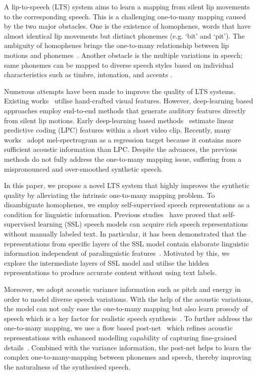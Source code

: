 \documentclass[letterpaper]{article} %
\begin{document}
A lip-to-speech (LTS) system aims to learn a mapping from silent lip movements to the corresponding speech.
This is a challenging one-to-many mapping caused by the two major obstacles.
One is the existence of homophenes, words that have almost identical lip movements but distinct phonemes (e.g. `bit' and `pit').
The ambiguity of homophenes brings the one-to-many relationship between lip motions and phonemes~\cite{son2017lip,kim2022distinguishing}.
Another obstacle is the multiple variations in speech; same phonemes can be mapped to diverse speech styles based on individual characteristics such as timbre, intonation, and accents \cite{elias2021parallel,kim2022fluenttts}.

Numerous attempts have been made to improve the quality of LTS systems.
Existing works~\cite{le2015reconstructing,le2017generating} utilise hand-crafted visual features. However, deep-learning based approaches employ end-to-end methods that generate auditory features directly from silent lip motions.
Early deep-learning based methods~\cite{ephrat2017vid2speech,kumar2019lipper} estimate linear predictive coding (LPC) features within a short video clip.
Recently, many works~\cite{prajwal2020learning, kim2021lip, yadav2021speech, he2022flow, mira2022svts, kim2023lip} adopt mel-spectrogram as a regression target because it contains more sufficient acoustic information than LPC.
Despite the advances, the previous methods do not fully address the one-to-many mapping issue, suffering from a mispronounced and over-smoothed synthetic speech.

In this paper, we propose a novel LTS system that highly improves the synthetic quality by alleviating the intrinsic one-to-many mapping problem.
To disambiguate homophenes, we employ self-supervised speech representations as a condition for linguistic information.
Previous studies~\cite{baevski2020wav2vec,hsu2021hubert} have proved that self-supervised learning (SSL) speech models can acquire rich speech representations without manually labeled text.
In particular, it has been demonstrated that the representations from specific layers of the SSL model contain elaborate linguistic information independent of paralinguistic features~\cite{yang21c_interspeech,chang2022distilhubert}.
Motivated by this, we explore the intermediate layers of SSL model and utilise the hidden representations to produce accurate content without using text labels.

Moreover, we adopt acoustic variance information such as pitch and energy in order to model diverse speech variations.
With the help of the acoustic variations, the model can not only ease the one-to-many mapping but also learn prosody of speech which is a key factor for realistic speech synthesis~\cite{skerry2018towards,sun2020fully}.
To further address the one-to-many mapping, we use a flow based post-net~\cite{ren2021portaspeech} which refines acoustic representations with enhanced modelling capability of capturing fine-grained details~\cite{ren2022revisiting}.
Combined with the variance information, the post-net helps to learn the complex one-to-many-mapping between phonemes and speech, thereby improving the naturalness of the synthesised speech.
\end{document}
